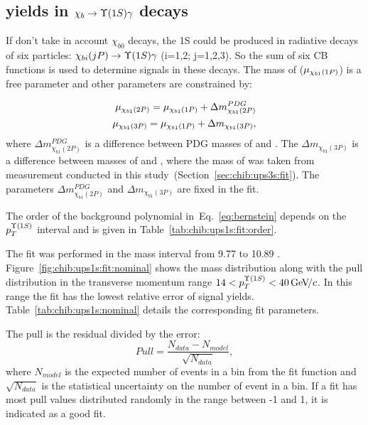 \subsection{\texorpdfstring{\chib}{xb} yields in
\texorpdfstring{$\chib \to \Y1S \gamma$}{xb -> Y\(1S\) gamma } decays}
\label{sec:chib:ups1s:fit}

If don't take in account $\chi_{b0}$ decays, the \Y1S could be produced in radiative decays
of six \chib particles: $\chi_{bi}(jP) \to \Y1S \gamma$ (i=1,2; j=1,2,3). So
the sum of six CB functions is used to determine \chib signals in these decays.
The mass of \chiboneOneP ($\mu_{\chi_{b 1}(1P)}$) is a free parameter and  other
parameters are constrained by:

\begin{equation}
  \begin{aligned}
\mu_{\chi_{b 1}(2P)} = \mu_{\chi_{b 1}(1P)} + \Delta m_{\chi_{b1}(2P)}^{PDG} \\
\mu_{\chi_{b 1}(3P)} = \mu_{\chi_{b 1}(1P)} + \Delta m_{\chi_{b1}(3P)}, \\
  \end{aligned}
\end{equation}
\noindent where $\Delta m_{\chi_{b1}(2P)}^{PDG}$ is a difference between PDG masses of
\chiboneTwoP and \chiboneOneP. The $\Delta  m_{\chi_{b1}(3P)}$ is a difference
between masses of \chiboneThreeP and \chiboneOneP, where the mass of
\chiboneThreeP was taken from measurement conducted in this
study~(Section~\ref{sec:chib:ups3s:fit}). The parameters  $\Delta
m_{\chi_{b1}(2P)}^{PDG}$ and $\Delta  m_{\chi_{b1}(3P)}$ are fixed in the fit.

The order of the background polynomial in~Eq.~\ref{eq:bernstein} depends on the
$p_{T}^{\OneS}$ interval and is given in Table~\ref{tab:chib:ups1s:fit:order}.



The fit was performed in the mass interval from  9.77 \gevcc to 10.89 \gevcc.
Figure~\ref{fig:chib:ups1s:fit:nominal} shows the mass distribution along with
the pull distribution in the transverse momentum range $14 < p_T^{\OneS} < 40
\gevc$. In this range the fit has the lowest relative error of signal yields. 
Table~\ref{tab:chib:ups1s:nominal} details the corresponding fit parameters.

The pull is the residual divided by the error:
\begin{equation}
\label{eq:pull}
Pull = \frac{N_{data} - N_{model}}{\sqrt{N_{data}}},
\end{equation}
\noindent where $N_{model}$ is the expected number of events in a bin from
the fit function and $\sqrt{N_{data}}$ is the statistical uncertainty on the
number of event in a bin. If a fit has most pull values distributed randomly 
in the range between -1 and 1, it is indicated as a good fit.


